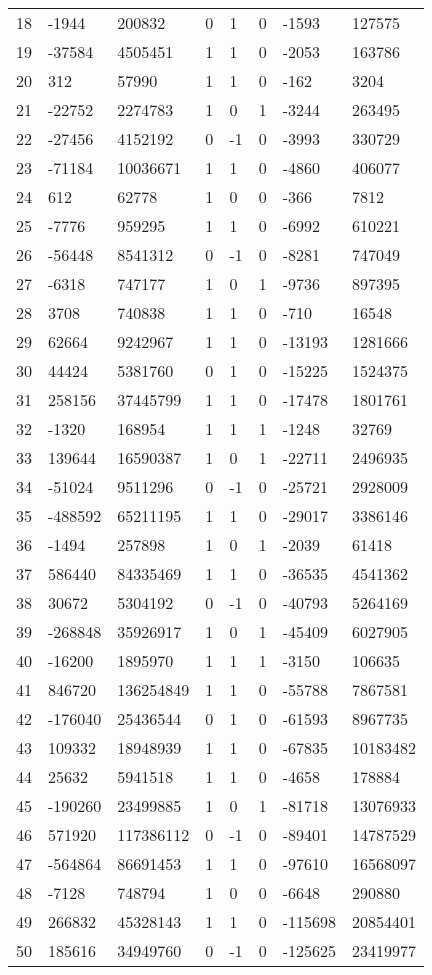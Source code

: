 \documentclass{amsart}
\begin{document}
\begin{longtable}{|l|l|l|lllll|}
18&-1944&200832&0&1&0&-1593&127575\\
19&-37584&4505451&1&1&0&-2053&163786\\
20&312&57990&1&1&0&-162&3204\\
21&-22752&2274783&1&0&1&-3244&263495\\
22&-27456&4152192&0&-1&0&-3993&330729\\
23&-71184&10036671&1&1&0&-4860&406077\\
24&612&62778&1&0&0&-366&7812\\
25&-7776&959295&1&1&0&-6992&610221\\
26&-56448&8541312&0&-1&0&-8281&747049\\
27&-6318&747177&1&0&1&-9736&897395\\
28&3708&740838&1&1&0&-710&16548\\
29&62664&9242967&1&1&0&-13193&1281666\\
30&44424&5381760&0&1&0&-15225&1524375\\
31&258156&37445799&1&1&0&-17478&1801761\\
32&-1320&168954&1&1&1&-1248&32769\\
33&139644&16590387&1&0&1&-22711&2496935\\
34&-51024&9511296&0&-1&0&-25721&2928009\\
35&-488592&65211195&1&1&0&-29017&3386146\\
36&-1494&257898&1&0&1&-2039&61418\\
37&586440&84335469&1&1&0&-36535&4541362\\
38&30672&5304192&0&-1&0&-40793&5264169\\
39&-268848&35926917&1&0&1&-45409&6027905\\
40&-16200&1895970&1&1&1&-3150&106635\\
41&846720&136254849&1&1&0&-55788&7867581\\
42&-176040&25436544&0&1&0&-61593&8967735\\
43&109332&18948939&1&1&0&-67835&10183482\\
44&25632&5941518&1&1&0&-4658&178884\\
45&-190260&23499885&1&0&1&-81718&13076933\\
46&571920&117386112&0&-1&0&-89401&14787529\\
47&-564864&86691453&1&1&0&-97610&16568097\\
48&-7128&748794&1&0&0&-6648&290880\\
49&266832&45328143&1&1&0&-115698&20854401\\
50&185616&34949760&0&-1&0&-125625&23419977\\
\hline
\end{longtable}
\end{document}
